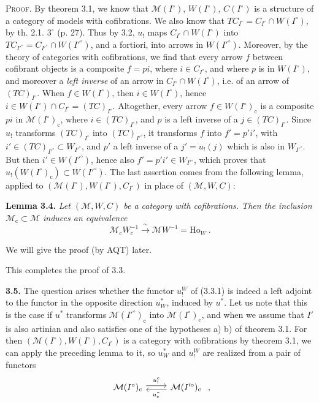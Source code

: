 \documentclass[11pt]{article}
\newcommand{\msp}[1]{\marginpar{\footnotesize [#1]}}
\begin{document}
\textsc{Proof}. By theorem 3.1, we know that $\mathcal{M}(I^\circ)$, $W(I^\circ)$, $C(I^\circ)$ is a structure of a category of models with cofibrations. We also know that $TC_{I^\circ}=C_{I^\circ}\cap W(I^\circ)$, by th. 2.1. $3^\circ$ (p. 27). Thus by 3.2, $u_!$ maps $C_{I^\circ}\cap W(I^\circ)$ into $TC_{I'^\circ}=C_{I'^\circ}\cap W(I'^\circ)$, and a fortiori, into arrows in $W(I'^\circ)$. Moreover, by the theory of categories with cofibrations, we find that every arrow $f$ between cofibrant objects is a composite $f=pi$, where $i\in C_{I^\circ}$, and where $p$ is in $W(I^\circ)$, and moreover a \textit{left inverse} of an arrow in $C_{I^\circ}\cap W(I^\circ)$, i.e. of an arrow of $(TC)_{I^\circ}$. When
\msp{56}
$f\in W(I^\circ)$, then $i\in W(I^\circ)$, hence $i\in W(I^\circ)\cap C_{I^\circ}=(TC)_{I^\circ}$. Altogether, every arrow $f\in W(I^\circ)_{\mathrm{c}}$ is a composite $pi$ in $\mathcal{M}(I^\circ)_{\mathrm{c}}$, where $i\in(TC)_{I^\circ}$, and $p$ is a left inverse of a $j\in(TC)_{I^\circ}$. Since $u_!$ transforms $(TC)_{I^\circ}$ into $(TC)_{I'^\circ}$, it transforms $f$ into $f'=p'i'$, with $i'\in(TC)_{I'^\circ}\subset W_{I'^\circ}$, and $p'$ a left inverse of a $j'=u_!(j)$ which is also in $W_{I'^\circ}$. But then $i'\in W(I'^\circ)$, hence also $f'=p'i'\in W_{I'^\circ}$, which proves that $u_!(W(I^\circ)_{\mathrm{c}})\subset W(I'^\circ)$. The last assertion comes from the following lemma, applied to $(\mathcal{M}(I^\circ),W(I^\circ),C_{I^\circ})$ in place of $(\mathcal{M},W,C)$:

\textbf{Lemma 3.4.} \textit{Let $(\mathcal{M},W,C)$ be a category with cofibrations. Then the inclusion $\mathcal{M}_{\mathrm{c}}\subset\mathcal{M}$ induces an equivalence}
\[
\mathcal{M}_{\mathrm{c}}W_{\mathrm{c}}^{-1} \xrightarrow{\ \sim\ } \mathcal{M}W^{-1}=\mathrm{Ho}_W\ .
\]

We will give the proof (by AQT) later.

This completes the proof of 3.3.

\textbf{3.5.} The question arises whether the functor $u_!^W$ of (3.3.1) is indeed a left adjoint
\msp{57}
to the functor in the opposite direction $u^*_W$, induced by $u^*$. Let us note that this is the case if $u^*$ transforms $\mathcal{M}(I'^\circ)_{\mathrm{c}}$ into $\mathcal{M}(I^\circ)_{\mathrm{c}}$, and when we assume that $I'$ is also artinian and also satisfies one of the hypotheses a) b) of theorem 3.1. For then $(\mathcal{M}(I^\circ),W(I^\circ),C_{I^\circ})$ is a category with cofibrations by theorem 3.1, we can apply the preceding lemma to it, so $u^*_W$ and $u_!^W$ are realized from a pair of functors
\[
\begin{tikzcd}
\mathcal{M}(I^\circ)_{\mathrm{c}} \arrow[r, shift left, "u_{!}^{\mathrm{c}}"] & \mathcal{M}(I'^\circ)_{\mathrm{c}} \arrow[l, shift left, "u_{\mathrm{c}}^*"]
\end{tikzcd}\ ,
\]
\end{document}
